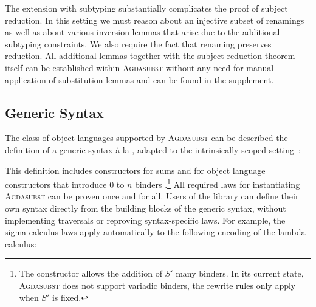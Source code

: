 \documentclass[screen,nonacm]{acmart}
\begin{document}
The extension with subtyping substantially complicates the proof of subject
reduction. In this setting we must reason about an injective subset of
renamings as well as about various inversion lemmas that arise due to the
additional subtyping constraints. We also require the fact that renaming
preserves reduction. All additional lemmas together with the subject reduction
theorem itself can be established within \textsc{Agdasubst} without any need
for manual application of substitution lemmas and can be found in the
supplement.

\subsection{Generic Syntax}\label{sec:ext-uni}
The class of object languages supported by \textsc{Agdasubst} can be described
the definition of a generic syntax à la
\citet{allais2021typescopesafeuniverse}, adapted to the intrinsically scoped
setting~\cite{saffrich:LIPIcs.ITP.2024.32}:

\begin{minipage}[t]{0.48\linewidth}
      \raggedright{}
      \GDesc{}
\end{minipage}
\begin{minipage}[t]{0.48\linewidth}
      \raggedright{}
      \GDenot{}
      \GTms{}
\end{minipage}

\noindent This definition includes constructors for sums  and for object language
constructors that introduce $0$ to $n$ binders .\footnote{The
       constructor allows the addition of $S'$ many
      binders. In its current state, \textsc{Agdasubst} does not support variadic
      binders, the rewrite rules only apply when $S'$ is fixed.}
All required laws for instantiating \textsc{Agdasubst} can be proven once and for
all. Users of the library can define their own syntax directly from the
building blocks of the generic syntax, without implementing traversals or reproving syntax-specific
laws. For example, the sigma-calculus laws apply automatically to the following
encoding of the lambda calculus:

\begin{minipage}[t]{0.48\linewidth}
      \raggedright{}
      \GDescL{}
\end{minipage}
\begin{minipage}[t]{0.48\linewidth}
      \raggedright{}
      \GPattern{}
\end{minipage}
\end{document}
